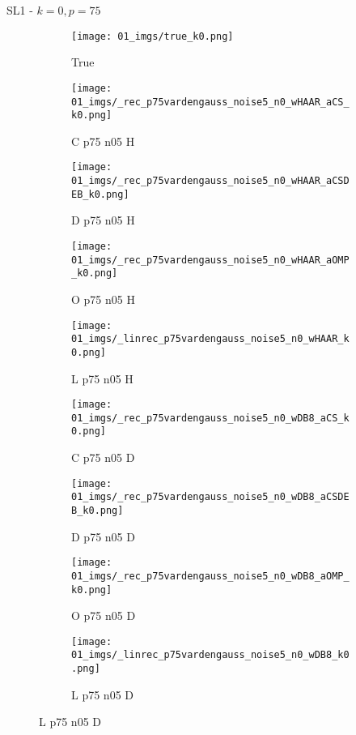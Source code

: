 \begin{frame}{SL1 - $k=0,p=75$}{}
\begin{figure}
\begin{subfigure}{0.1\textwidth}
\texttt{[image: 01\_imgs/true\_k0.png]}
\caption*{\Tiny True}
\end{subfigure}
\begin{subfigure}{0.1\textwidth}
\texttt{[image: 01\_imgs/\_rec\_p75vardengauss\_noise5\_n0\_wHAAR\_aCS\_k0.png]}
\caption*{\Tiny C p75 n05 H}
\end{subfigure}
\begin{subfigure}{0.1\textwidth}
\texttt{[image: 01\_imgs/\_rec\_p75vardengauss\_noise5\_n0\_wHAAR\_aCSDEB\_k0.png]}
\caption*{\Tiny D p75 n05 H}
\end{subfigure}
\begin{subfigure}{0.1\textwidth}
\texttt{[image: 01\_imgs/\_rec\_p75vardengauss\_noise5\_n0\_wHAAR\_aOMP\_k0.png]}
\caption*{\Tiny O p75 n05 H}
\end{subfigure}
\begin{subfigure}{0.1\textwidth}
\texttt{[image: 01\_imgs/\_linrec\_p75vardengauss\_noise5\_n0\_wHAAR\_k0.png]}
\caption*{\Tiny L p75 n05 H}
\end{subfigure}
\begin{subfigure}{0.1\textwidth}
\texttt{[image: 01\_imgs/\_rec\_p75vardengauss\_noise5\_n0\_wDB8\_aCS\_k0.png]}
\caption*{\Tiny C p75 n05 D}
\end{subfigure}
\begin{subfigure}{0.1\textwidth}
\texttt{[image: 01\_imgs/\_rec\_p75vardengauss\_noise5\_n0\_wDB8\_aCSDEB\_k0.png]}
\caption*{\Tiny D p75 n05 D}
\end{subfigure}
\begin{subfigure}{0.1\textwidth}
\texttt{[image: 01\_imgs/\_rec\_p75vardengauss\_noise5\_n0\_wDB8\_aOMP\_k0.png]}
\caption*{\Tiny O p75 n05 D}
\end{subfigure}
\begin{subfigure}{0.1\textwidth}
\texttt{[image: 01\_imgs/\_linrec\_p75vardengauss\_noise5\_n0\_wDB8\_k0.png]}
\caption*{\Tiny L p75 n05 D}
\end{subfigure}

\vspace{5pt}


\end{figure}
\end{frame}
